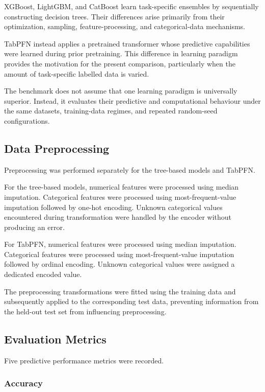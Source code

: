 XGBoost, LightGBM, and CatBoost learn task-specific ensembles by sequentially constructing decision trees. Their differences arise primarily from their optimization, sampling, feature-processing, and categorical-data mechanisms.

TabPFN instead applies a pretrained transformer whose predictive capabilities were learned during prior pretraining. This difference in learning paradigm provides the motivation for the present comparison, particularly when the amount of task-specific labelled data is varied.

The benchmark does not assume that one learning paradigm is universally superior. Instead, it evaluates their predictive and computational behaviour under the same datasets, training-data regimes, and repeated random-seed configurations.

\subsection{Data Preprocessing}\label{data-preprocessing}

Preprocessing was performed separately for the tree-based models and TabPFN.

For the tree-based models, numerical features were processed using median imputation. Categorical features were processed using most-frequent-value imputation followed by one-hot encoding. Unknown categorical values encountered during transformation were handled by the encoder without producing an error.

For TabPFN, numerical features were processed using median imputation. Categorical features were processed using most-frequent-value imputation followed by ordinal encoding. Unknown categorical values were assigned a dedicated encoded value.

The preprocessing transformations were fitted using the training data and subsequently applied to the corresponding test data, preventing information from the held-out test set from influencing preprocessing.

\subsection{Evaluation Metrics}\label{evaluation-metrics}

Five predictive performance metrics were recorded.

\subsubsection{Accuracy}\label{accuracy}

